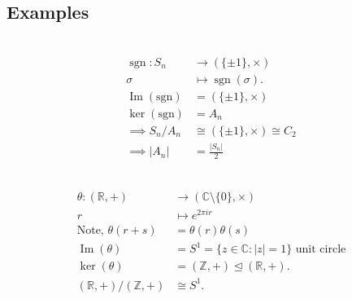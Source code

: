 \hypertarget{examples}{%
\subsection{Examples}\label{examples}}

\begin{example} ~\vspace*{-1.5\baselineskip}
\begin{align*}
    \operatorname{sgn} : S_n &\to ( \{ \pm 1 \}, \times) \\
    \sigma &\mapsto \operatorname{sgn}(\sigma). \\
    \operatorname{Im}(\text{sgn}) &= ( \{ \pm 1 \}, \times) \\
    \ker(\text{sgn}) &= A_n \\
    \implies S_n / A_n &\cong ( \{ \pm 1 \}, \times) \cong C_2 \\
    \implies |A_n| &= \frac{|S_n|}{2}
\end{align*}
\end{example}

\begin{example} ~\vspace*{-1.5\baselineskip}
\begin{align*}
    \theta : (\mathbb{R}, +) &\to (\mathbb{C} \setminus \{ 0 \}, \times) \\
    r &\mapsto e^{2 \pi i r} \\
    \text{Note, } \theta(r + s) &= \theta(r) \theta(s) \\
    \operatorname{Im}(\theta) &= S^1 = \{ z \in \mathbb{C} : |z| = 1 \} \text{ unit circle} \\
    \ker (\theta) &= (\mathbb{Z}, +) \trianglelefteq  (\mathbb{R}, +) . \\
    (\mathbb{R}, +) / (\mathbb{Z}, +) &\cong S^1.
\end{align*}
\end{example}

